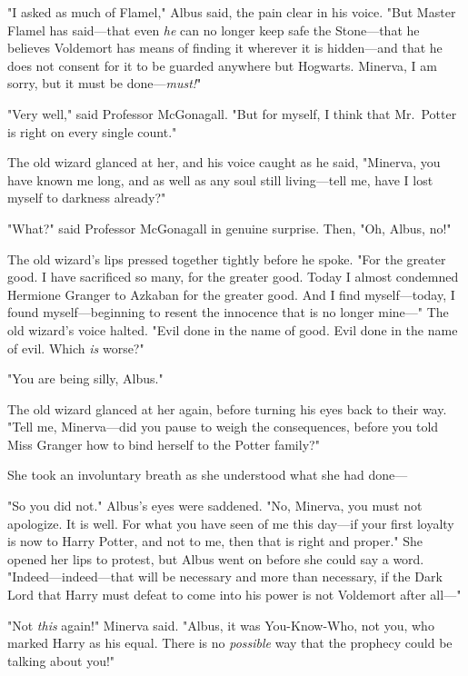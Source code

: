 "I asked as much of Flamel," Albus said, the pain clear in his voice. "But 
Master Flamel has said---that even \emph{he} can no longer keep safe the 
Stone---that he believes Voldemort has means of finding it wherever it is 
hidden---and that he does not consent for it to be guarded anywhere but 
Hogwarts. Minerva, I am sorry, but it must be done---\emph{must!}"

"Very well," said Professor McGonagall. "But for myself, I think that 
Mr.~Potter is right on every single count."

The old wizard glanced at her, and his voice caught as he said, "Minerva, you 
have known me long, and as well as any soul still living---tell me, have I lost 
myself to darkness already?"

"What?" said Professor McGonagall in genuine surprise. Then, "Oh, Albus, no!"

The old wizard's lips pressed together tightly before he spoke. "For the 
greater good. I have sacrificed so many, for the greater good. Today I almost 
condemned Hermione Granger to Azkaban for the greater good. And I find 
myself---today, I found myself---beginning to resent the innocence that is no 
longer mine---" The old wizard's voice halted. "Evil done in the name of good. 
Evil done in the name of evil. Which \emph{is} worse?"

"You are being silly, Albus."

The old wizard glanced at her again, before turning his eyes back to their way. 
"Tell me, Minerva---did you pause to weigh the consequences, before you told 
Miss Granger how to bind herself to the Potter family?"

She took an involuntary breath as she understood what she had done---

"So you did not." Albus's eyes were saddened. "No, Minerva, you must not 
apologize. It is well. For what you have seen of me this day---if your first 
loyalty is now to Harry Potter, and not to me, then that is right and proper." 
She opened her lips to protest, but Albus went on before she could say a word. 
"Indeed---indeed---that will be necessary and more than necessary, if the Dark 
Lord that Harry must defeat to come into his power is not Voldemort after 
all---"

"Not \emph{this} again!" Minerva said. "Albus, it was You-Know-Who, not you, 
who marked Harry as his equal. There is no \emph{possible} way that the 
prophecy could be talking about you!"

